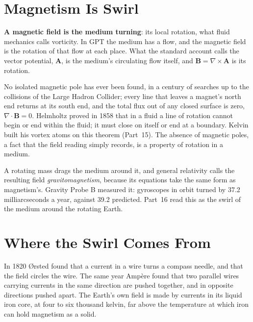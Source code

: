 \documentclass[11pt,a4paper]{article}
\begin{document}
\section{Magnetism Is Swirl}
\label{sec:swirl}

\begin{hypbar}
\textbf{A magnetic field is the medium turning}: its local rotation, what fluid mechanics calls vorticity. In GPT the medium has a flow, and the magnetic field is the rotation of that flow at each place. What the standard account calls the vector potential, $\mathbf{A}$, is the medium's circulating flow itself, and $\mathbf{B}=\nabla\times\mathbf{A}$ is its rotation.
\end{hypbar}

 No isolated magnetic pole has ever been found, in a century of searches up to the collisions of the Large Hadron Collider; every line that leaves a magnet's north end returns at its south end, and the total flux out of any closed surface is zero, $\nabla\cdot\mathbf{B}=0$.  Helmholtz proved in 1858 that in a fluid a line of rotation cannot begin or end within the fluid; it must close on itself or end at a boundary. Kelvin built his vortex atoms on this theorem (Part~15). The absence of magnetic poles, a fact that the field reading simply records, is a property of rotation in a medium.

 A rotating mass drags the medium around it, and general relativity calls the resulting field \emph{gravitomagnetism}, because its equations take the same form as magnetism's. Gravity Probe B measured it: gyroscopes in orbit turned by 37.2 milliarcseconds a year, against 39.2 predicted. Part~16 read this as the swirl of the medium around the rotating Earth. 

\section{Where the Swirl Comes From}
\label{sec:sources}

 In 1820 Ørsted found that a current in a wire turns a compass needle, and that the field circles the wire. The same year Ampère found that two parallel wires carrying currents in the same direction are pushed together, and in opposite directions pushed apart. The Earth's own field is made by currents in its liquid iron core, at four to six thousand kelvin, far above the temperature at which iron can hold magnetism as a solid.
\end{document}
